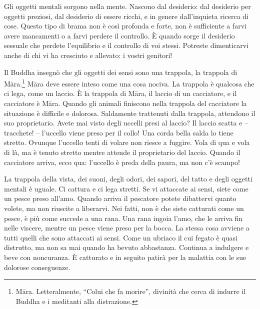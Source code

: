Gli oggetti mentali sorgono nella mente. Nascono dal desiderio: dal
desiderio per oggetti preziosi, dal desiderio di essere ricchi, e in
genere dall'inquieta ricerca di cose. Questo tipo di brama non è così
profonda e forte, non è sufficiente a farvi avere mancamenti o a farvi
perdere il controllo. È quando sorge il desiderio sessuale che perdete
l'equilibrio e il controllo di voi stessi. Potreste dimenticarvi anche
di chi vi ha cresciuto e allevato: i vostri genitori!

Il Buddha insegnò che gli oggetti dei sensi sono una trappola, la
trappola di Māra.\footnote{Māra. Letteralmente, ``Colui che fa morire'',
  divinità che cerca di indurre il Buddha e i meditanti alla
  distrazione.} Māra deve essere inteso come una cosa nociva. La
trappola è qualcosa che ci lega, come un laccio. È la trappola di Māra,
il laccio di un cacciatore, e il cacciatore è Māra. Quando gli animali
finiscono nella trappola del cacciatore la situazione è difficile e
dolorosa. Saldamente trattenuti dalla trappola, attendono il suo
proprietario. Avete mai visto degli uccelli presi al laccio? Il laccio
scatta e -- tracchete! -- l'uccello viene preso per il collo! Una corda
bella salda lo tiene stretto. Ovunque l'uccello tenti di volare non
riesce a fuggire. Vola di qua e vola di là, ma è tenuto stretto mentre
attende il proprietario del laccio. Quando il cacciatore arriva, ecco
qua: l'uccello è preda della paura, ma non c'è scampo!

La trappola della vista, dei suoni, degli odori, dei sapori, del tatto e
degli oggetti mentali è uguale. Ci cattura e ci lega stretti. Se vi
attaccate ai sensi, siete come un pesce preso all'amo. Quando arriva il
pescatore potete dibattervi quanto volete, ma non riuscite a liberarvi.
Nei fatti, non è che siete catturati come un pesce, è più come succede a
una rana. Una rana ingoia l'amo, che le arriva fin nelle viscere, mentre
un pesce viene preso per la bocca. La stessa cosa avviene a tutti quelli
che sono attaccati ai sensi. Come un ubriaco il cui fegato è quasi
distrutto, ma non sa mai quando ha bevuto abbastanza. Continua a
indulgere e beve con noncuranza. È catturato e in seguito patirà per la
malattia con le sue dolorose conseguenze.

